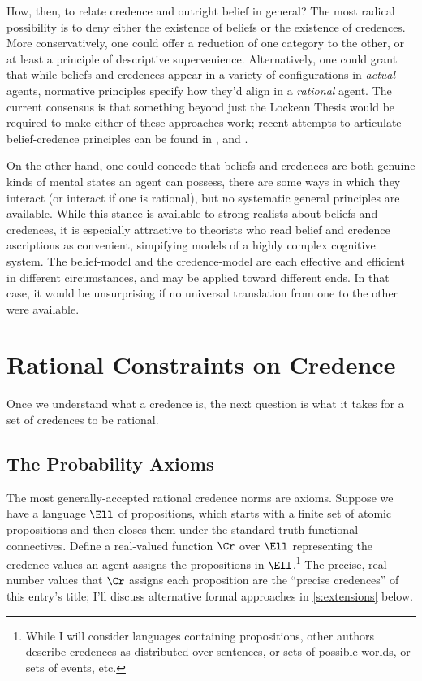How, then, to relate credence and outright belief in general? The most radical possibility is to deny either the existence of beliefs or the existence of credences. More conservatively, one could offer a reduction of one category to the other, or at least a principle of descriptive supervenience. Alternatively, one could grant that while beliefs and credences appear in a variety of configurations in \emph{actual} agents, normative principles specify how they'd align in a \emph{rational} agent. The current consensus is that something beyond just the Lockean Thesis would be required to make either of these approaches work; recent attempts to articulate belief-credence principles can be found in \citet{LeitgebStability,DouvenPragmatics}, and \citet{LinKellyGeological}.

On the other hand, one could concede that beliefs and credences are both genuine kinds of mental states an agent can possess, there are some ways in which they interact (or interact if one is rational), but no systematic general principles are available. While this stance is available to strong realists about beliefs and credences, it is especially attractive to theorists who read belief and credence ascriptions as convenient, simpifying models of a highly complex cognitive system. The belief-model and the credence-model are each effective and efficient in different circumstances, and may be applied toward different ends. In that case, it would be unsurprising if no universal translation from one to the other were available.  
 


\section{Rational Constraints on Credence}\label{s:constraints}

Once we understand what a credence is, the next question is what it takes for a set of credences to be rational.

\subsection{The Probability Axioms}\label{ss:Kolm}

The most generally-accepted rational credence norms are  axioms. Suppose we have a language $\Ell$ of propositions, which starts with a finite set of atomic propositions and then closes them under the standard truth-functional connectives. Define a real-valued function $\Cr$ over $\Ell$ representing the credence values an agent assigns the propositions in $\Ell$.\footnote
{While I will consider languages containing propositions, other authors describe credences as distributed over sentences, or sets of possible worlds, or sets of events, etc.} 
 The precise, real-number values that $\Cr$ assigns each proposition are the ``precise credences'' of this entry's title; I'll discuss alternative formal approaches in \autoref{s:extensions}  below.

